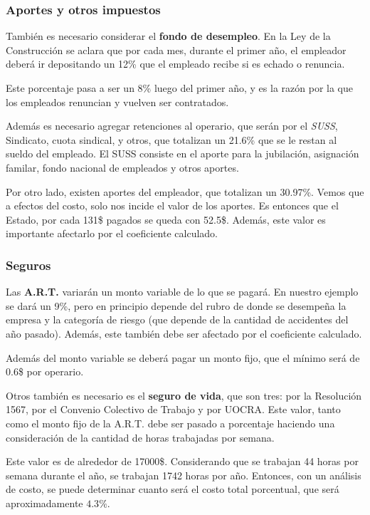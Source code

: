 \documentclass[../main.tex]{subfiles}
\begin{document}
\subsubsection{Aportes y otros impuestos}

También es necesario considerar el \textbf{fondo de desempleo}. En la Ley de la
Construcción se aclara que por cada mes, durante el primer año, el empleador
deberá ir depositando un 12\% que el empleado recibe si es echado o renuncia.

Este porcentaje pasa a ser un 8\% luego del primer año, y es la razón por la que
los empleados renuncian y vuelven ser contratados.

Además es necesario agregar retenciones al operario, que serán por el \textit{SUSS},
Sindicato, cuota sindical, y otros, que totalizan un 21.6\% que se le restan al
sueldo del empleado. El SUSS consiste en el aporte para la jubilación, asignación
familar, fondo nacional de empleados y otros aportes.

Por otro lado, existen aportes del empleador, que totalizan un 30.97\%. Vemos que
a efectos del costo, solo nos incide el valor de los aportes. Es entonces que el
Estado, por cada 131\$ pagados se queda con 52.5\$. Además, este valor es importante
afectarlo por el coeficiente calculado.

\subsubsection{Seguros}

Las \textbf{A.R.T.} variarán un monto variable de lo que se pagará. En nuestro 
ejemplo se dará un 9\%, pero en principio depende del rubro de donde se desempeña
la empresa y la categoría de riesgo (que depende de la cantidad de accidentes
del año pasado). Además, este también debe ser afectado por el coeficiente 
calculado. 

Además del monto variable se deberá pagar un monto fijo, que el mínimo será de
0.6\$ por operario. 

Otros también es necesario es el \textbf{seguro de vida}, que son tres:
por la Resolución 1567, por el Convenio Colectivo de Trabajo y por UOCRA.
Este valor, tanto como el monto fijo de la A.R.T. debe ser pasado a porcentaje 
haciendo una consideración de la cantidad de horas trabajadas por semana.

Este valor es de alrededor de 17000\$. Considerando que se trabajan 44 horas
por semana durante el año, se trabajan 1742 horas por año. Entonces, con un
análisis de costo, se puede determinar cuanto será el costo total porcentual, que 
será aproximadamente $4.3\%$. 
\end{document}
